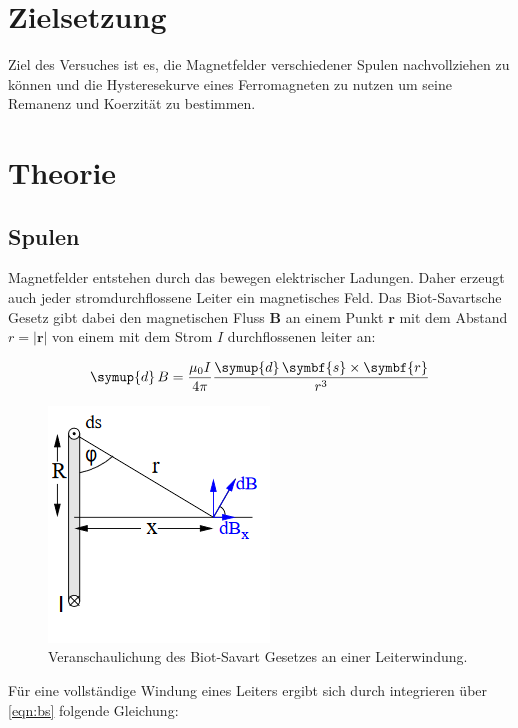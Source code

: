 \section{Zielsetzung}
\label{sec:Zielsetzung}

Ziel des Versuches ist es, die Magnetfelder
verschiedener Spulen nachvollziehen zu können
und die Hysteresekurve eines Ferromagneten zu
nutzen um seine Remanenz und Koerzität zu
bestimmen.

\section{Theorie}
\label{sec:Theorie}

\subsection{Spulen}

Magnetfelder entstehen durch das bewegen elektrischer Ladungen.
Daher erzeugt auch jeder stromdurchflossene Leiter ein magnetisches
Feld. Das Biot-Savartsche Gesetz gibt dabei den magnetischen Fluss
$\symbf{B}$ an einem Punkt $\symbf{r}$ mit dem Abstand $r=|\symbf{r}|$
von einem mit dem Strom $I$ durchflossenen leiter an:

\begin{equation}
  \symup{d}\,B=\frac{\mu_0I}{4\pi}\frac{\symup{d}\,\symbf{s}\times\symbf{r}}{r^3}
  \label{eqn:bs}
\end{equation}

\begin{figure}
  \centering
  \includegraphics{content/images/biot savart idee.png}
  \caption{Veranschaulichung des Biot-Savart Gesetzes an einer Leiterwindung\cite{anleitung}.}
  \label{fig:bs}
\end{figure}

Für eine vollständige Windung eines Leiters ergibt sich
durch integrieren über \eqref{eqn:bs} folgende Gleichung:

